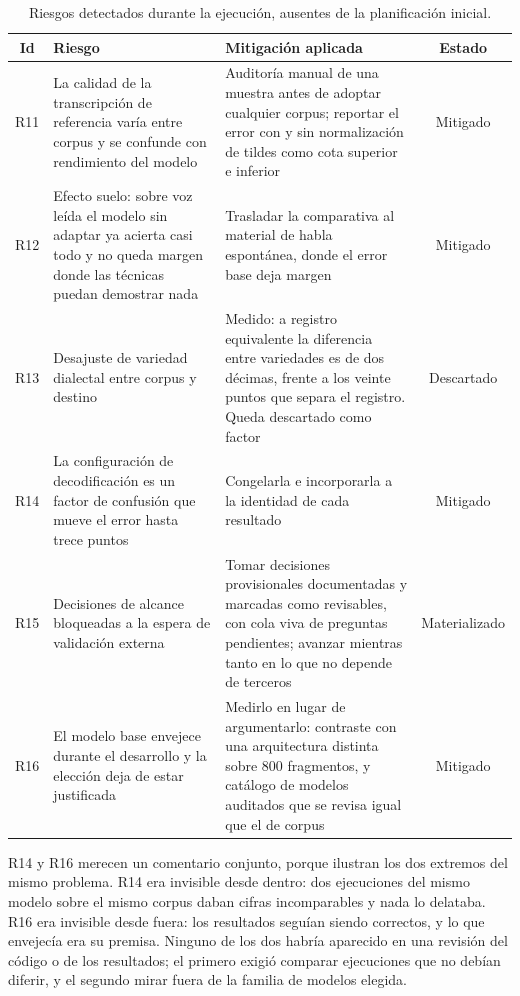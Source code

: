 \begin{table}[h]
\centering
\footnotesize
\setlength{\tabcolsep}{4pt}
\begin{tabular}{|c|p{5.1cm}|p{5.6cm}|c|}
\hline
\textbf{Id} & \textbf{Riesgo} & \textbf{Mitigación aplicada} & \textbf{Estado} \\
\hline
R11 & La calidad de la transcripción de referencia varía entre corpus y se confunde con
      rendimiento del modelo & Auditoría manual de una muestra antes de adoptar cualquier
      corpus; reportar el error con y sin normalización de tildes como cota superior e
      inferior & Mitigado \\
\hline
R12 & Efecto suelo: sobre voz leída el modelo sin adaptar ya acierta casi todo y no queda
      margen donde las técnicas puedan demostrar nada & Trasladar la comparativa al material
      de habla espontánea, donde el error base deja margen & Mitigado \\
\hline
R13 & Desajuste de variedad dialectal entre corpus y destino & Medido: a registro
      equivalente la diferencia entre variedades es de dos décimas, frente a los veinte
      puntos que separa el registro. Queda descartado como factor & Descartado \\
\hline
R14 & La configuración de decodificación es un factor de confusión que mueve el error hasta
      trece puntos & Congelarla e incorporarla a la identidad de cada resultado & Mitigado \\
\hline
R15 & Decisiones de alcance bloqueadas a la espera de validación externa & Tomar decisiones
      provisionales documentadas y marcadas como revisables, con cola viva de preguntas
      pendientes; avanzar mientras tanto en lo que no depende de terceros & Materializado \\
\hline
R16 & El modelo base envejece durante el desarrollo y la elección deja de estar justificada
      & Medirlo en lugar de argumentarlo: contraste con una arquitectura distinta sobre 800
      fragmentos, y catálogo de modelos auditados que se revisa igual que el de corpus &
      Mitigado \\
\hline
\end{tabular}
\caption{Riesgos detectados durante la ejecución, ausentes de la planificación inicial.}
\label{tab:riesgos-emergentes}
\end{table}

R14 y R16 merecen un comentario conjunto, porque ilustran los dos extremos del mismo
problema. R14 era invisible desde dentro: dos ejecuciones del mismo modelo sobre el mismo
corpus daban cifras incomparables y nada lo delataba. R16 era invisible desde fuera: los
resultados seguían siendo correctos, y lo que envejecía era su premisa. Ninguno de los dos
habría aparecido en una revisión del código o de los resultados; el primero exigió comparar
ejecuciones que no debían diferir, y el segundo mirar fuera de la familia de modelos
elegida.

